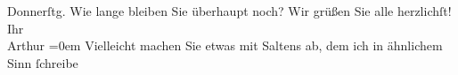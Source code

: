 \begin{ledgroupsized}[t]{13cm}
                  Donnerſtg\label{KLL02194_Beer-Hofmann-2v}\label{KLL02194_Beer-Hofmann-2h}.\pend
           \pstart
           Wie lange bleiben Sie überhaupt noch?\pend
           \pstart
           Wir grüßen Sie alle herzlichſt!\pend
           \pstart
           Ihr{\\[\baselineskip]}\spacefill\mbox{Arthur}\pend
           \leftskip=0em{}\pstart
           Vielleicht machen Sie \introOben{}etwas\introOben{} mit Saltens ab, dem ich in ähnlichem Sinn ſchreibe\pend
           \endnumbering{}\end{ledgroupsized}  \newcommand{\dateiname}{L02194}\newcommand{\titel}{Arthur Schnitzler an Richard Beer-Hofmann, 22. 8. 1914}\newcommand{\editorInnen}{Martin Anton Müller und Gerd-Hermann Susen}
            \footnotesize
\begin{ledgroupsized}[t]{11.5cm}
\end{ledgroupsized}
         
      